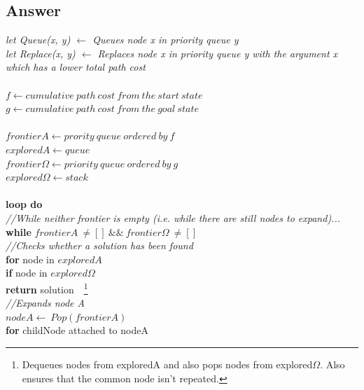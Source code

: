 \documentclass{article}
\begin{document}
\subsection{Answer}
\textit{let Queue(x, y) $\leftarrow$ Queues node x in priority queue y} \\
\textit{let Replace(x, y) $\leftarrow$ Replaces node x in priority queue y with the argument x which has a lower total path cost}
\\~\\
$f \leftarrow cumulative\ path\ cost\ from\ the\ start\ state$ \\
$g \leftarrow cumulative\ path\ cost\ from\ the\ goal\ state$
\\~\\
$frontierA \leftarrow prority\ queue\ ordered\ by\ f$ \\
$exploredA \leftarrow queue$ \\
$frontier\Omega \leftarrow priority\ queue\ ordered\ by\ g$ \\
$explored\Omega \leftarrow stack$
\\~\\
\textbf{loop do}\\
\-\hspace{10mm} \textit{//While neither frontier is empty (i.e. while there are still nodes to expand)...}\\
\-\hspace{10mm} \textbf{while} $frontierA\ \neq []\ \&\&\ frontier\Omega\ \neq []$\\
\-\hspace{20mm} \textit{//Checks whether a solution has been found} \\
\-\hspace{20mm} \textbf{for} node in $exploredA$ \\ 
\-\hspace{30mm} \textbf{if} node in $explored\Omega$ \\
\-\hspace{40mm} \textbf{return} solution\ \ \footnote{Dequeues nodes from exploredA and also pops nodes from explored$\Omega$. Also ensures that the common node isn't repeated.} \\ 
\-\hspace{20mm} \textit{//Expands node A} \\
\-\hspace{20mm} $nodeA \leftarrow \ Pop(frontierA)$ \\
\-\hspace{20mm} \textbf{for} childNode attached to nodeA \\
\end{document}
